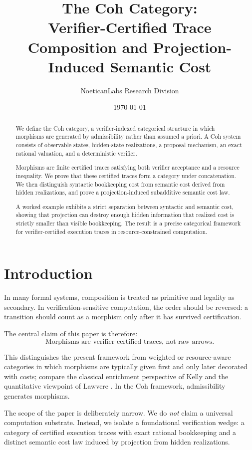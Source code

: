 \documentclass[11pt]{article}
\title{\textbf{The Coh Category:\\
Verifier-Certified Trace Composition and Projection-Induced Semantic Cost}}
\author{NoeticanLabs Research Division}
\date{\today}
\begin{document}
\maketitle

\begin{abstract}
We define the Coh category, a verifier-indexed categorical structure in which morphisms are generated by admissibility rather than assumed a priori. A Coh system consists of observable states, hidden-state realizations, a proposal mechanism, an exact rational valuation, and a deterministic verifier.

Morphisms are finite certified traces satisfying both verifier acceptance and a resource inequality. We prove that these certified traces form a category under concatenation. We then distinguish syntactic bookkeeping cost from semantic cost derived from hidden realizations, and prove a projection-induced subadditive semantic cost law.

A worked example exhibits a strict separation between syntactic and semantic cost, showing that projection can destroy enough hidden information that realized cost is strictly smaller than visible bookkeeping. The result is a precise categorical framework for verifier-certified execution traces in resource-constrained computation.
\end{abstract}

\section{Introduction}

In many formal systems, composition is treated as primitive and legality as secondary. In verification-sensitive computation, the order should be reversed: a transition should count as a morphism only after it has survived certification.

The central claim of this paper is therefore:
\[
\boxed{
\text{Morphisms are verifier-certified traces, not raw arrows.}
}
\]

This distinguishes the present framework from weighted or resource-aware categories in which morphisms are typically given first and only later decorated with costs; compare the classical enrichment perspective of Kelly \cite{kelly1982} and the quantitative viewpoint of Lawvere \cite{lawvere1973}. In the Coh framework, admissibility generates morphisms.

The scope of the paper is deliberately narrow. We do \emph{not} claim a universal computation substrate. Instead, we isolate a foundational verification wedge: a category of certified execution traces with exact rational bookkeeping and a distinct semantic cost law induced by projection from hidden realizations.
\end{document}

